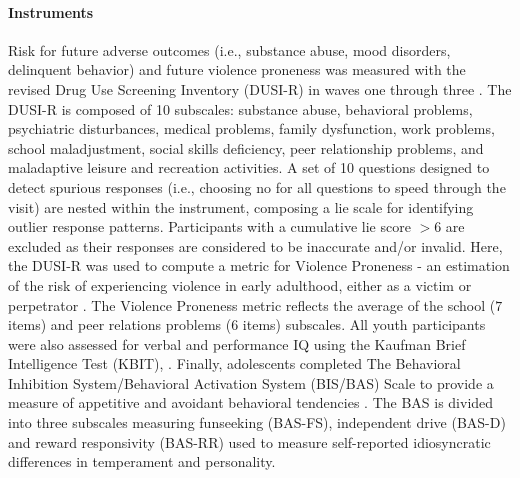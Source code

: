 \documentclass[utf8]{frontiersSCNS} %
\begin{document}
\paragraph{Instruments} Risk for future adverse outcomes (i.e., substance abuse, mood disorders, delinquent behavior) and future violence proneness was measured with the revised Drug Use Screening Inventory (DUSI-R) in waves one through three \citep{tarter1994reliability}. The DUSI-R is composed of 10 subscales: substance abuse, behavioral problems, psychiatric disturbances, medical problems, family dysfunction, work problems, school maladjustment, social skills deficiency, peer relationship problems, and maladaptive leisure and recreation activities. A set of 10 questions designed to detect spurious responses (i.e., choosing no for all questions to speed through the visit) are nested within the instrument, composing a lie scale for identifying outlier response patterns. Participants with a cumulative lie score $>6$ are excluded as their responses are considered to be inaccurate and/or invalid. Here, the DUSI-R was used to compute a metric for Violence Proneness - an estimation of the risk of experiencing violence in early adulthood, either as a victim or perpetrator \citep{kirisci2009violence}. The Violence Proneness metric reflects the average of the school ($7$ items) and peer relations problems ($6$ items) subscales. All youth participants were also assessed for verbal and performance IQ using the Kaufman Brief Intelligence Test (KBIT), \citep{kaufman2004kaufman}. Finally, adolescents completed The Behavioral Inhibition System/Behavioral Activation System (BIS/BAS) Scale  to provide a measure of appetitive and avoidant behavioral tendencies \citep{carver1994behavioral}. The BAS is divided into three subscales measuring funseeking (BAS-FS), independent drive (BAS-D) and reward responsivity (BAS-RR) used to measure self-reported idiosyncratic differences in temperament and personality.
\end{document}
